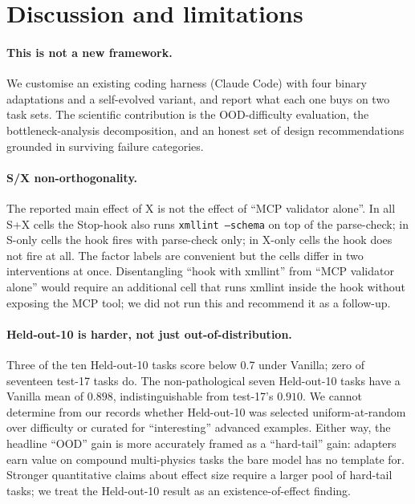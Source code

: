 \documentclass{article}
\begin{document}
\section{Discussion and limitations}
\label{sec:discussion}
\label{subsec:limitations}

\paragraph{This is not a new framework.}
We customise an existing coding harness (Claude Code) with four binary adaptations and a self-evolved variant, and report what each one buys on two task sets. The scientific contribution is the OOD-difficulty evaluation, the bottleneck-analysis decomposition, and an honest set of design recommendations grounded in surviving failure categories.

\paragraph{S/X non-orthogonality.}
The reported main effect of $\mathrm{X}$ is not the effect of ``MCP validator alone''. In all S+X cells the Stop-hook also runs \texttt{xmllint --schema} on top of the parse-check; in S-only cells the hook fires with parse-check only; in X-only cells the hook does not fire at all. The factor labels are convenient but the cells differ in two interventions at once. Disentangling ``hook with xmllint'' from ``MCP validator alone'' would require an additional cell that runs xmllint inside the hook without exposing the MCP tool; we did not run this and recommend it as a follow-up.

\paragraph{Held-out-10 is harder, not just out-of-distribution.}
Three of the ten Held-out-10 tasks score below 0.7 under Vanilla; zero of seventeen test-17 tasks do. The non-pathological seven Held-out-10 tasks have a Vanilla mean of $0.898$, indistinguishable from test-17's $0.910$. We cannot determine from our records whether Held-out-10 was selected uniform-at-random over difficulty or curated for ``interesting'' advanced examples. Either way, the headline ``OOD'' gain is more accurately framed as a ``hard-tail'' gain: adapters earn value on compound multi-physics tasks the bare model has no template for. Stronger quantitative claims about effect size require a larger pool of hard-tail tasks; we treat the Held-out-10 result as an existence-of-effect finding.
\end{document}

